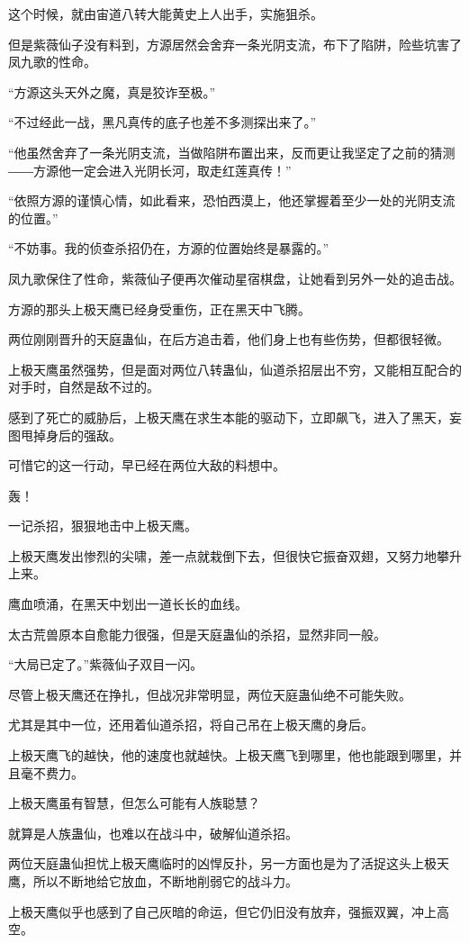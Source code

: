 \begin{this_body}
这个时候，就由宙道八转大能黄史上人出手，实施狙杀。

但是紫薇仙子没有料到，方源居然会舍弃一条光阴支流，布下了陷阱，险些坑害了凤九歌的性命。

“方源这头天外之魔，真是狡诈至极。”

“不过经此一战，黑凡真传的底子也差不多测探出来了。”

“他虽然舍弃了一条光阴支流，当做陷阱布置出来，反而更让我坚定了之前的猜测――方源他一定会进入光阴长河，取走红莲真传！”

“依照方源的谨慎心情，如此看来，恐怕西漠上，他还掌握着至少一处的光阴支流的位置。”

“不妨事。我的侦查杀招仍在，方源的位置始终是暴露的。”

凤九歌保住了性命，紫薇仙子便再次催动星宿棋盘，让她看到另外一处的追击战。

方源的那头上极天鹰已经身受重伤，正在黑天中飞腾。

两位刚刚晋升的天庭蛊仙，在后方追击着，他们身上也有些伤势，但都很轻微。

上极天鹰虽然强势，但是面对两位八转蛊仙，仙道杀招层出不穷，又能相互配合的对手时，自然是敌不过的。

感到了死亡的威胁后，上极天鹰在求生本能的驱动下，立即飙飞，进入了黑天，妄图甩掉身后的强敌。

可惜它的这一行动，早已经在两位大敌的料想中。

轰！

一记杀招，狠狠地击中上极天鹰。

上极天鹰发出惨烈的尖啸，差一点就栽倒下去，但很快它振奋双翅，又努力地攀升上来。

鹰血喷涌，在黑天中划出一道长长的血线。

太古荒兽原本自愈能力很强，但是天庭蛊仙的杀招，显然非同一般。

“大局已定了。”紫薇仙子双目一闪。

尽管上极天鹰还在挣扎，但战况非常明显，两位天庭蛊仙绝不可能失败。

尤其是其中一位，还用着仙道杀招，将自己吊在上极天鹰的身后。

上极天鹰飞的越快，他的速度也就越快。上极天鹰飞到哪里，他也能跟到哪里，并且毫不费力。

上极天鹰虽有智慧，但怎么可能有人族聪慧？

就算是人族蛊仙，也难以在战斗中，破解仙道杀招。

两位天庭蛊仙担忧上极天鹰临时的凶悍反扑，另一方面也是为了活捉这头上极天鹰，所以不断地给它放血，不断地削弱它的战斗力。

上极天鹰似乎也感到了自己灰暗的命运，但它仍旧没有放弃，强振双翼，冲上高空。


\end{this_body}

